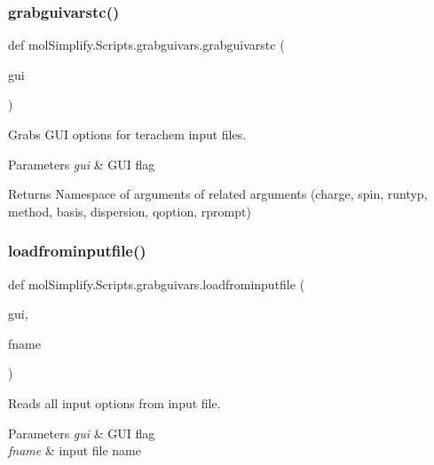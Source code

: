\subsubsection{\texorpdfstring{grabguivarstc()}{grabguivarstc()}}
{\footnotesize\ttfamily def mol\+Simplify.\+Scripts.\+grabguivars.\+grabguivarstc (\begin{DoxyParamCaption}\item[{}]{gui }\end{DoxyParamCaption})}



Grabs G\+UI options for terachem input files. 


\begin{DoxyParams}{Parameters}
{\em gui} & G\+UI flag \\
\hline
\end{DoxyParams}
\begin{DoxyReturn}{Returns}
Namespace of arguments of related arguments (charge, spin, runtyp, method, basis, dispersion, qoption, rprompt) 
\end{DoxyReturn}
\mbox{\label{namespacemolSimplify_1_1Scripts_1_1grabguivars_a8a268814aff1d53aa3c2ba617c3229f7}} 
\subsubsection{\texorpdfstring{loadfrominputfile()}{loadfrominputfile()}}
{\footnotesize\ttfamily def mol\+Simplify.\+Scripts.\+grabguivars.\+loadfrominputfile (\begin{DoxyParamCaption}\item[{}]{gui,  }\item[{}]{fname }\end{DoxyParamCaption})}



Reads all input options from input file. 


\begin{DoxyParams}{Parameters}
{\em gui} & G\+UI flag \\
\hline
{\em fname} & input file name \\
\hline
\end{DoxyParams}
\mbox{\label{namespacemolSimplify_1_1Scripts_1_1grabguivars_ab22fbc8d867b9fb23211808f5a874636}} 
